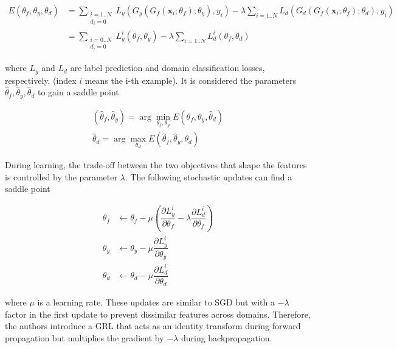 \begin{equation}
\begin{split}
E(\theta_f, \theta_y, \theta_d) & = \sum_{\substack{i=1..N \\ d_i = 0}} L_y(G_y(G_f(\textbf{x}_i; \theta_f); \theta_y), y_i) - \lambda \sum_{i = 1..N} L_d(G_d(G_f(\textbf{x}_i; \theta_f); \theta_d), y_i) \\ & = \sum_{\substack{i=0..N \\ d_i = 0}} L_y^i(\theta_f, \theta_y) - \lambda \sum_{i=1..N} L_d^i(\theta_f, \theta_d)
\end{split}
\end{equation} 

 where $L_y$ and $L_d$ are label prediction and domain classification losses, respectively. (index $i$ means the i-th example). It is considered the parameters $\hat{\theta}_f, \hat{\theta}_y, \hat{\theta}_d$ to gain a saddle point

\begin{equation}
\begin{split}
(\hat{\theta}_f , \hat{\theta}_y ) = \arg \min_{\theta_f, \theta_y} E(\theta_f, \theta_y, \hat{\theta}_d)
\\
\hat{\theta}_d = \arg \max_{\theta_d} E(\hat{\theta}_f, \hat{\theta}_y, \theta_d)
\end{split}
\end{equation}

During learning, the trade-off between the two objectives that shape the features is controlled by the parameter $\lambda$. The following stochastic updates can find a saddle point

\begin{equation}
\begin{split}
\theta_f & \leftarrow \theta_f - \mu \left( \dfrac{\partial L_y^i}{\partial \theta_f} - \lambda \dfrac{\partial L_d^i}{\partial \theta_f} \right) \\ 
\theta_y & \leftarrow \theta_y - \mu \dfrac{\partial L_y^i}{\partial \theta_y} \\ 
\theta_d & \leftarrow \theta_d - \mu \dfrac{\partial L_d^i}{\partial \theta_d} 
\end{split}
\end{equation} 

where $\mu$ is a learning rate. These updates are similar to SGD but with a $-\lambda$ factor in the first update to prevent dissimilar features across domains. Therefore, the authors introduce a GRL that acts as an identity transform during forward propagation but multiplies the gradient by $-\lambda$ during backpropagation.